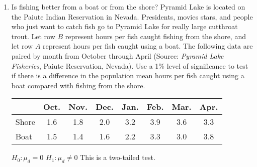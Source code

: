 \begin{enumerate}
\begin{enumerate}
        \vfill
        
        \item Compute the test statistic $t$ and the corresponding $P$-value.
        
        
        {\answer Using \texttt{T-Test} with $\mu_0 = 0$, \texttt{List:} $L_3$, \texttt{Freq: 1} and $\mu: < \mu_0$, we get $t\approx -1.3856$ and $P \approx 0.1016$.}
        \vfill
        
        \item What conclusion do you make based on this hypothesis test?
        
        {\answer Since $P > \alpha$, we fail to reject $H_0$. This means we have insufficient evidence to support the claim that the mean deposit of banks today is greater than the mean deposit three years ago.}
        
        \vfill
        
    \end{enumerate}

\newpage

\item Is fishing better from a boat or from the shore? Pyramid Lake is located on the Paiute Indian Reservation in Nevada. Presidents, movies stars, and people who just want to catch fish go to Pyramid Lake for really large cutthroat trout.  Let row $B$ represent hours per fish caught fishing from the shore, and let row $A$ represent hours per fish caught using a boat. The following data are paired by month from October through April (Source: {\em Pyramid Lake Fisheries}, Paiute Reservation, Nevada). Use a 1\% level of significance to test if there is a difference in the population mean hours per fish caught using a boat compared with fishing from the shore.  

\begin{center}
\begin{tabular}{l|ccccccc}

& Oct. & Nov. & Dec. & Jan. & Feb. & Mar. & Apr.  \\
\hline
Shore & 1.6 & 1.8 & 2.0 & 3.2 & 3.9 & 3.6 & 3.3  \\
\hline
Boat & 1.5 & 1.4 & 1.6 & 2.2 & 3.3 & 3.0 & 3.8  \\
\hline
\end{tabular}
\end{center} 
	
{\answer 
$H_0: \mu_d = 0$  
$H_1: \mu_d \neq 0$  
This is a two-tailed test.  

}
\end{enumerate}
